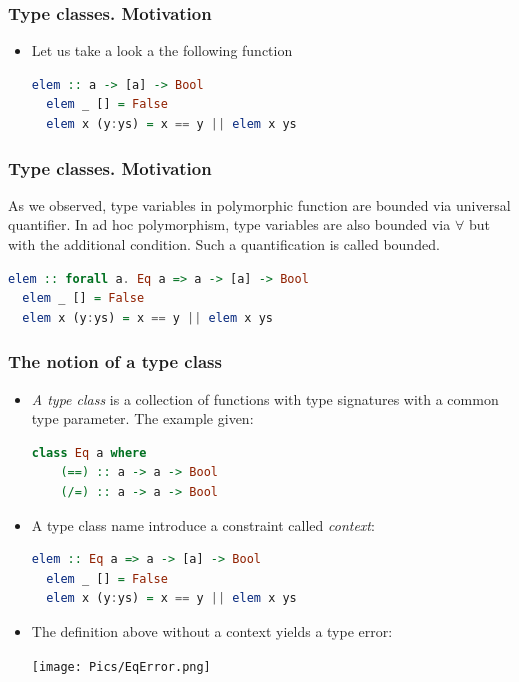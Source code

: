 \documentclass[10pt,pdf,utf8,russian,aspectratio=169]{beamer}
\begin{document}
\begin{frame}[fragile]
  \frametitle{Type classes. Motivation}

\begin{itemize}
  \item Let us take a look a the following function

  \begin{lstlisting}[language=Haskell]
  elem :: a -> [a] -> Bool
  elem _ [] = False
  elem x (y:ys) = x == y || elem x ys
  \end{lstlisting}

 
\end{itemize}
\end{frame}

\begin{frame}[fragile]
  \frametitle{Type classes. Motivation}
  As we observed, type variables in polymorphic function are bounded via universal quantifier. In ad hoc polymorphism, type variables are also bounded via $\forall$ but with the additional condition. Such a quantification is called bounded.

  \begin{lstlisting}[language=Haskell]
  elem :: forall a. Eq a => a -> [a] -> Bool
  elem _ [] = False
  elem x (y:ys) = x == y || elem x ys
  \end{lstlisting}

\end{frame}

\begin{frame}[fragile]
  \frametitle{The notion of a type class}

\begin{itemize}
  \item \emph{A type class} is a collection of functions with type signatures with a common type parameter. The example given:

  \begin{lstlisting}[language=Haskell]
  class Eq a where
    (==) :: a -> a -> Bool
    (/=) :: a -> a -> Bool
  \end{lstlisting}

  \item A type class name introduce a constraint called \emph{context}:

  \begin{lstlisting}[language=Haskell]
  elem :: Eq a => a -> [a] -> Bool
  elem _ [] = False
  elem x (y:ys) = x == y || elem x ys
  \end{lstlisting}

  \item The definition above without a context yields a type error:
  \begin{center}
  \texttt{[image: Pics/EqError.png]}
  \end{center}
\end{itemize}
\end{frame}
\end{document}
